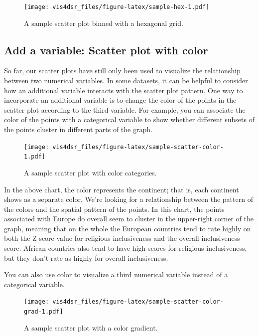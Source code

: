 \documentclass[
]{krantz}
\begin{document}
\begin{figure}
\centering
\texttt{[image: vis4dsr\_files/figure-latex/sample-hex-1.pdf]}
\caption{\label{fig:sample-hex}A sample scatter plot binned with a hexagonal grid.}
\end{figure}

\hypertarget{add-a-variable-scatter-plot-with-color}{%
\subsection{Add a variable: Scatter plot with color}\label{add-a-variable-scatter-plot-with-color}}

So far, our scatter plots have still only been used to visualize the relationship
between two numerical variables. In some datasets, it can be helpful to consider
how an additional variable interacts with the scatter plot pattern. One way to
incorporate an additional variable is to change the color of the points in the
scatter plot according to the third variable. For example, you can associate the
color of the points with a categorical variable to show whether different subsets
of the points cluster in different parts of the graph.

\begin{figure}
\centering
\texttt{[image: vis4dsr\_files/figure-latex/sample-scatter-color-1.pdf]}
\caption{\label{fig:sample-scatter-color}A sample scatter plot with color categories.}
\end{figure}

In the above chart, the color represents the continent; that is, each continent shows
as a separate color. We're looking for a relationship between the pattern of the colors
and the spatial pattern of the points. In this chart, the points associated with
Europe do overall seem to cluster in the upper-right corner of the graph, meaning that
on the whole the European countries tend to rate highly on both the Z-score value
for religious inclusiveness and the overall inclusiveness score. African countries
also tend to have high scores for religious inclusiveness, but they don't rate as
highly for overall inclusiveness.

You can also use color to visualize a third numerical variable instead of a
categorical variable.

\begin{figure}
\centering
\texttt{[image: vis4dsr\_files/figure-latex/sample-scatter-color-grad-1.pdf]}
\caption{\label{fig:sample-scatter-color-grad}A sample scatter plot with a color gradient.}
\end{figure}
\end{document}
